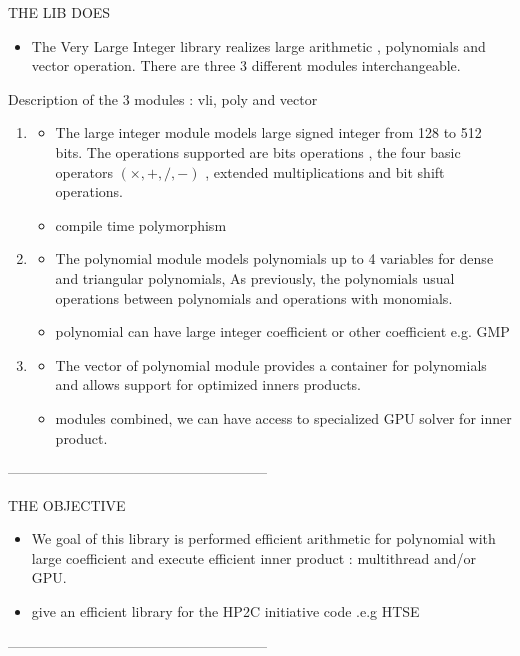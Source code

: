 \documentclass[oribibl]{llncs2e/llncs}
\begin{document}
 THE LIB DOES
\begin{itemize}
\item The Very Large Integer library realizes large arithmetic , polynomials  and vector operation.  There are three 3 different modules interchangeable. 
\end{itemize}
Description of the 3 modules : vli, poly and vector
\begin{enumerate}
\item  \begin{itemize}
\item The large integer module models large signed integer from 128 to 512 bits. The operations supported are bits operations , the four basic operators $(\times,+,/,-)$ , extended multiplications and bit shift operations. 
\item compile time polymorphism
\end{itemize}
\item \begin{itemize}
\item The polynomial module models polynomials up to 4 variables for dense and triangular polynomials, As previously, the polynomials usual  operations between polynomials and operations with monomials.  
\item polynomial can have large integer coefficient or other coefficient e.g. GMP
\end{itemize}

\item \begin{itemize}
\item The vector of polynomial module provides a container for polynomials and allows support for optimized inners products.
\item  modules combined, we can have access to specialized GPU solver for inner product.
\end{itemize}
\end{enumerate}

--------------------------------------------------------

THE OBJECTIVE

\begin{itemize}
\item  We goal of this library is performed efficient arithmetic for polynomial with large coefficient and execute efficient inner product : multithread and/or GPU.
\item give an efficient library for the HP2C initiative code .e.g  HTSE
\end{itemize}
--------------------------------------------------------
\end{document}
